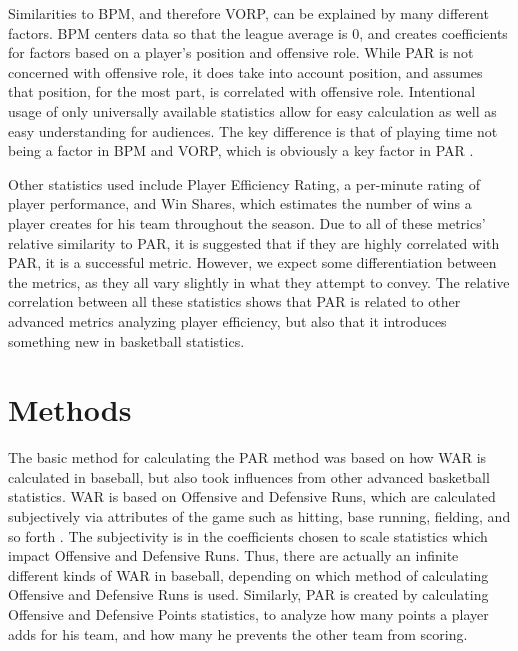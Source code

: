 \documentclass[12pt]{article}
\begin{document}
Similarities to BPM, and therefore VORP, can be explained by many 
different factors. BPM centers data so that the league average is 0, and 
creates coefficients for factors based on a player's position and offensive 
role. While PAR is not concerned with offensive role, it does take into 
account position, and assumes that position, for the most part, is 
correlated with offensive role. Intentional usage of only universally 
available statistics allow for easy calculation as well as easy 
understanding for audiences. The key difference is that of playing time not 
being a factor in BPM and VORP, which is obviously a key factor in PAR 
\citep{BasketballReferenceBPM}.

Other statistics used include Player Efficiency Rating, a 
per-minute rating of player performance, and Win Shares, which 
estimates the number of wins a player creates 
for his team throughout the season. Due to all of these metrics' relative 
similarity to PAR, it is suggested 
that if they are highly correlated with PAR, it is a successful metric. 
However, we expect some differentiation 
between the metrics, as they all vary slightly in what they attempt to 
convey. The relative correlation 
between all these statistics shows that PAR is related to other advanced 
metrics analyzing player efficiency, 
but also that it introduces something new in basketball statistics.



\section{Methods}

The basic method for calculating the PAR method was based on how 
WAR is calculated in baseball, but 
also took influences from other advanced basketball statistics. WAR is 
based on Offensive and Defensive 
Runs, which are calculated subjectively via attributes of the game such as 
hitting, base running, fielding, 
and so forth \citep{BaseballWAR}. The subjectivity is in the coefficients 
chosen to scale 
statistics which impact Offensive and 
Defensive Runs. Thus, there are actually an infinite different kinds of WAR 
in baseball, depending on which 
method of calculating Offensive and Defensive Runs is used. Similarly, 
PAR is created by calculating 
Offensive and Defensive Points statistics, to analyze how many points a 
player adds for his team, and how 
many he prevents the other team from scoring. 
\end{document}
